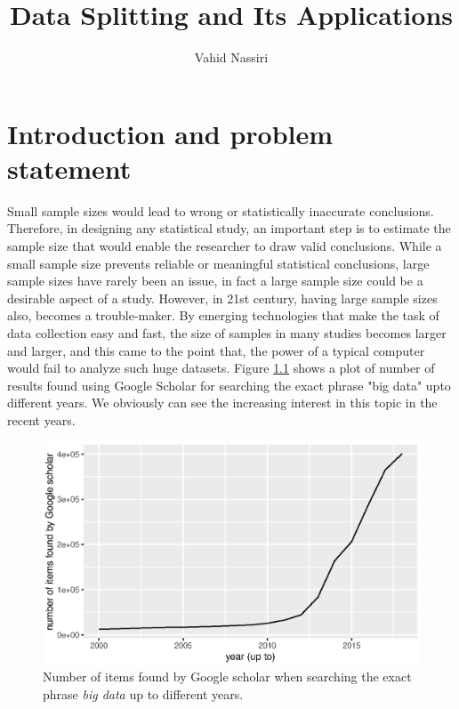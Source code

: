 \documentclass[11pt,a5paper,twoside]{book}
\title{Data Splitting and Its Applications}
\author{Vahid Nassiri}
\newcommand{\clearemptydoublepage}%
        {\newpage{\pagestyle{empty}\cleardoublepage}}
\begin{document}
\pagestyle{fancy}

\maketitle
 \frontmatter
\tableofcontents
\listoffigures
\listoftables


\clearemptydoublepage
\mainmatter

\clearemptydoublepage

\chapter[Introduction]{Introduction and problem statement}
\label{sec_intro1}

Small sample sizes would lead to wrong or statistically inaccurate conclusions. Therefore, in designing any statistical study, an important step is to estimate the sample size that would enable the researcher to draw valid conclusions. While a small sample size prevents reliable or meaningful statistical conclusions, large sample sizes have rarely been an issue, in fact a large sample size could be a desirable aspect of a study. However, in 21st century, having large sample sizes also, becomes a trouble-maker. By emerging technologies that make the task of data collection easy and fast, the size of samples in many studies becomes larger and larger, and this came to the point that, the power of a typical computer would fail to analyze such huge datasets. Figure \ref{fig_bigdata} shows a plot of number of results found using Google Scholar for searching the exact phrase "big data" upto different years. We obviously can see the increasing interest in this topic in the recent years.




\begin{figure}
\centering
\includegraphics[width=\textwidth]{bigdata.eps}
\caption{Number of items found by Google scholar when searching the exact phrase \emph{big data} up to different years.} 
\label{fig_bigdata}
\end{figure} 
\end{document}
